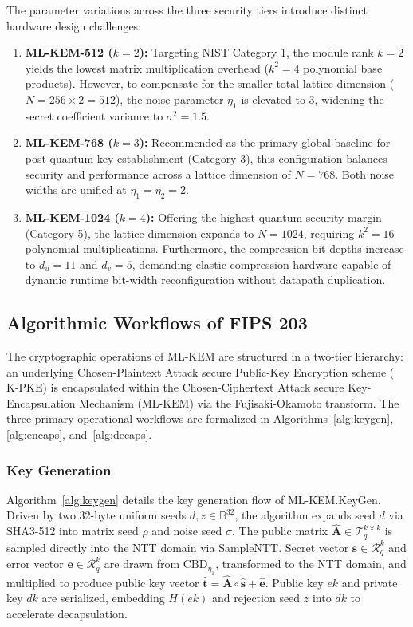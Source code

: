 The parameter variations across the three security tiers introduce distinct hardware design challenges:
\begin{enumerate}
    \item \textbf{ML-KEM-512 ($k = 2$):} Targeting NIST Category 1, the module rank $k = 2$ yields the lowest matrix multiplication overhead ($k^2 = 4$ polynomial base products). However, to compensate for the smaller total lattice dimension ($N = 256 \times 2 = 512$), the noise parameter $\eta_1$ is elevated to $3$, widening the secret coefficient variance to $\sigma^2 = 1.5$.
    \item \textbf{ML-KEM-768 ($k = 3$):} Recommended as the primary global baseline for post-quantum key establishment (Category 3), this configuration balances security and performance across a lattice dimension of $N = 768$. Both noise widths are unified at $\eta_1 = \eta_2 = 2$.
    \item \textbf{ML-KEM-1024 ($k = 4$):} Offering the highest quantum security margin (Category 5), the lattice dimension expands to $N = 1024$, requiring $k^2 = 16$ polynomial multiplications. Furthermore, the compression bit-depths increase to $d_u = 11$ and $d_v = 5$, demanding elastic compression hardware capable of dynamic runtime bit-width reconfiguration without datapath duplication.
\end{enumerate}

\subsection{Algorithmic Workflows of FIPS 203}
\label{sec:prelim_algorithms}

The cryptographic operations of \mbox{ML-KEM} are structured in a two-tier hierarchy: an underlying Chosen-Plaintext Attack secure Public-Key Encryption scheme ($\text{K-PKE}$) is encapsulated within the Chosen-Ciphertext Attack secure Key-Encapsulation Mechanism ($\text{ML-KEM}$) via the Fujisaki-Okamoto transform. The three primary operational workflows are formalized in Algorithms~\ref{alg:keygen}, \ref{alg:encaps}, and~\ref{alg:decaps}.

\subsubsection{Key Generation}
Algorithm~\ref{alg:keygen} details the key generation flow of \mbox{ML-KEM.KeyGen}. Driven by two 32-byte uniform seeds $d, z \in \mathbb{B}^{32}$, the algorithm expands seed $d$ via SHA3-512 into matrix seed $\rho$ and noise seed $\sigma$. The public matrix $\hat{\mathbf{A}} \in \mathcal{T}_q^{k \times k}$ is sampled directly into the NTT domain via $\text{SampleNTT}$. Secret vector $\mathbf{s} \in \mathcal{R}_q^k$ and error vector $\mathbf{e} \in \mathcal{R}_q^k$ are drawn from $\text{CBD}_{\eta_1}$, transformed to the NTT domain, and multiplied to produce public key vector $\hat{\mathbf{t}} = \hat{\mathbf{A}} \circ \hat{\mathbf{s}} + \hat{\mathbf{e}}$. Public key $ek$ and private key $dk$ are serialized, embedding $H(ek)$ and rejection seed $z$ into $dk$ to accelerate decapsulation.

